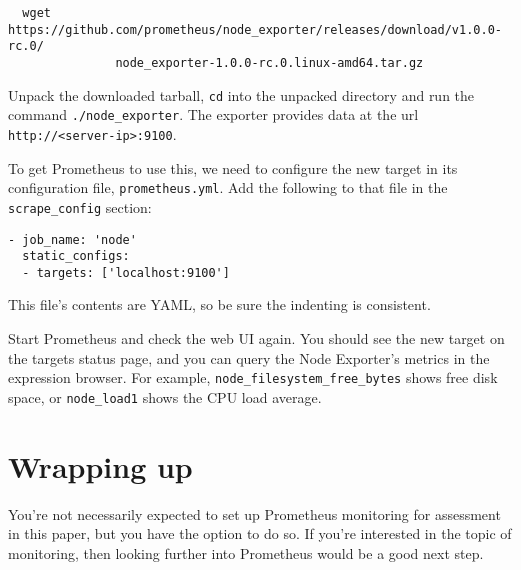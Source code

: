 \documentclass{article}   	%
\begin{document}
\begin{verbatim}
  wget https://github.com/prometheus/node_exporter/releases/download/v1.0.0-rc.0/
               node_exporter-1.0.0-rc.0.linux-amd64.tar.gz  
\end{verbatim}

Unpack the downloaded tarball, \texttt{cd} into the unpacked directory and run the command \texttt{./node\_exporter}. The exporter provides data at the url \texttt{http://<server-ip>:9100}.

To get Prometheus to use this, we need to configure the new target in its configuration file, \texttt{prometheus.yml}. Add the following to that file in the \texttt{scrape\_config} section:

\begin{verbatim}
- job_name: 'node'
  static_configs:
  - targets: ['localhost:9100']
\end{verbatim}

This file's contents are YAML, so be sure the indenting is consistent.

Start Prometheus and check the web UI again. You should see the new target on the targets status page, and you can query the Node Exporter's metrics in the expression browser. For example, \texttt{node\_filesystem\_free\_bytes} shows free disk space, or \texttt{node\_load1} shows the CPU load average. 

\section{Wrapping up}
You're not necessarily expected to set up Prometheus monitoring for assessment in this paper, but you have the option to do so. If you're interested in the topic of monitoring, then looking further into Prometheus would be a good next step. 
\end{document}
